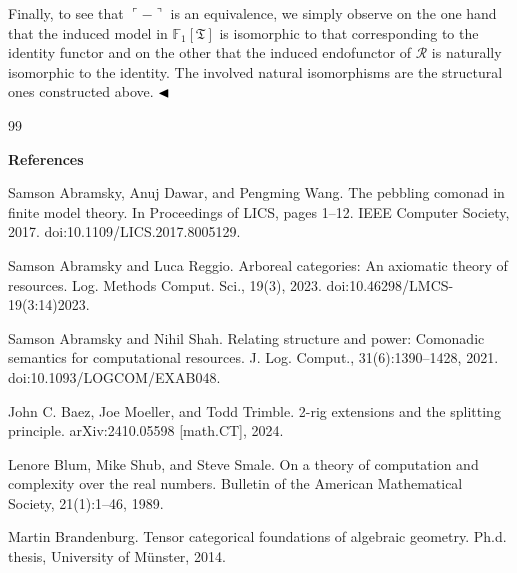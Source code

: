 \documentclass[10pt,a4paper]{amsart}
\begin{document}
 
 
Finally, to see that $\ulcorner-\urcorner$ is an equivalence, we simply observe on the one hand that the induced model in $\mathbb{F}_{1}[\mathfrak{T}]$ is isomorphic to that corresponding to the identity functor and on the other that the induced endofunctor of $\mathcal{R}$ is naturally isomorphic to the identity. The involved natural isomorphisms are the structural ones constructed above. $\hfill\blacktriangleleft$\par
 
 
 

\begin{thebibliography}{99}

 
\par\medskip\noindent\textbf{References}\par
  
\par\noindent  [1]  Samson Abramsky, Anuj Dawar, and Pengming Wang.  The pebbling comonad in finite model theory.  In Proceedings of LICS, pages 1–12. IEEE Computer Society, 2017.  doi:10.1109/LICS.2017.8005129.  
 
\par\noindent  [2]  Samson Abramsky and Luca Reggio.  Arboreal categories: An axiomatic theory of resources.  Log. Methods Comput. Sci., 19(3), 2023.  doi:10.46298/LMCS-19(3:14)2023.  
 
\par\noindent  [3]  Samson Abramsky and Nihil Shah.  Relating structure and power: Comonadic semantics for computational resources.  J. Log. Comput., 31(6):1390–1428, 2021.  doi:10.1093/LOGCOM/EXAB048.  
 
\par\noindent  [4]  John C. Baez, Joe Moeller, and Todd Trimble.  2-rig extensions and the splitting principle.  arXiv:2410.05598 [math.CT], 2024.  
 
\par\noindent  [5]  Lenore Blum, Mike Shub, and Steve Smale.  On a theory of computation and complexity over the real numbers.  Bulletin of the American Mathematical Society, 21(1):1–46, 1989.  
 
\par\noindent  [6]  Martin Brandenburg.  Tensor categorical foundations of algebraic geometry.  Ph.d. thesis, University of Münster, 2014.  
 

\end{thebibliography}
\end{document}
